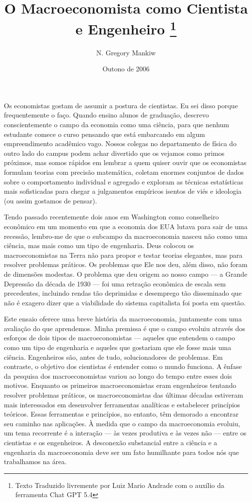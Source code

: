 \documentclass[12pt]{article}
\title{O Macroeconomista como Cientista e Engenheiro \thanks{Texto Traduzido livremente por Luiz Mario Andrade com o auxílio da ferramenta Chat GPT 5.4}}
\author{N. Gregory Mankiw}
\date{Outono de 2006}
\begin{document}
\maketitle

Os economistas gostam de assumir a postura de cientistas. Eu sei disso porque frequentemente o faço. Quando ensino alunos de graduação, descrevo conscientemente o campo da economia como uma ciência, para que nenhum estudante comece o curso pensando que está embarcando em algum empreendimento acadêmico vago. Nossos colegas no departamento de física do outro lado do campus podem achar divertido que os vejamos como primos próximos, mas somos rápidos em lembrar a quem quiser ouvir que os economistas formulam teorias com precisão matemática, coletam enormes conjuntos de dados sobre o comportamento individual e agregado e exploram as técnicas estatísticas mais sofisticadas para chegar a julgamentos empíricos isentos de viés e ideologia (ou assim gostamos de pensar).

Tendo passado recentemente dois anos em Washington como conselheiro econômico em um momento em que a economia dos EUA lutava para sair de uma recessão, lembro-me de que o subcampo da macroeconomia nasceu não como uma ciência, mas mais como um tipo de engenharia. Deus colocou os macroeconomistas na Terra não para propor e testar teorias elegantes, mas para resolver problemas práticos. Os problemas que Ele nos deu, além disso, não foram de dimensões modestas. O problema que deu origem ao nosso campo — a Grande Depressão da década de 1930 — foi uma retração econômica de escala sem precedentes, incluindo rendas tão deprimidas e desemprego tão disseminado que não é exagero dizer que a viabilidade do sistema capitalista foi posta em questão.

Este ensaio oferece uma breve história da macroeconomia, juntamente com uma avaliação do que aprendemos. Minha premissa é que o campo evoluiu através dos esforços de dois tipos de macroeconomistas — aqueles que entendem o campo como um tipo de engenharia e aqueles que gostariam que ele fosse mais uma ciência. Engenheiros são, antes de tudo, solucionadores de problemas. Em contraste, o objetivo dos cientistas é entender como o mundo funciona. A ênfase da pesquisa dos macroeconomistas variou ao longo do tempo entre esses dois motivos. Enquanto os primeiros macroeconomistas eram engenheiros tentando resolver problemas práticos, os macroeconomistas das últimas décadas estiveram mais interessados em desenvolver ferramentas analíticas e estabelecer princípios teóricos. Essas ferramentas e princípios, no entanto, têm demorado a encontrar seu caminho nas aplicações. À medida que o campo da macroeconomia evoluiu, um tema recorrente é a interação — às vezes produtiva e às vezes não — entre os cientistas e os engenheiros. A desconexão substancial entre a ciência e a engenharia da macroeconomia deve ser um fato humilhante para todos nós que trabalhamos na área.
\end{document}

